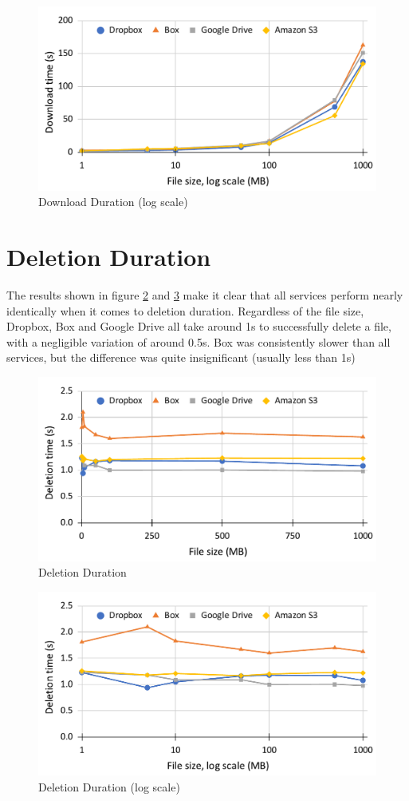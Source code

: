 \begin{figure} [!h]
	\centering
	\includegraphics[scale=0.6]{images/download_log_chart}
	\caption{\label{fig:download_log_duration}Download Duration (log scale)}
\end{figure}

\section{Deletion Duration}
The results shown in figure \ref{fig:deletion_duration} and \ref{fig:deletion_log_duration} make it clear that all services perform nearly identically when it comes to deletion duration. Regardless of the file size, Dropbox, Box and Google Drive all take around 1s to successfully delete a file, with a negligible variation of around 0.5s. Box was consistently slower than all services, but the difference was quite insignificant (usually less than 1s)

\begin{figure} [!h]
	\centering
	\includegraphics[scale=0.5]{images/deletion_chart}
	\caption{\label{fig:deletion_duration}Deletion Duration}
\end{figure}

\begin{figure} [!h]
	\centering
	\includegraphics[scale=0.5]{images/deletion_log_chart}
	\caption{\label{fig:deletion_log_duration}Deletion Duration (log scale)}
\end{figure}
